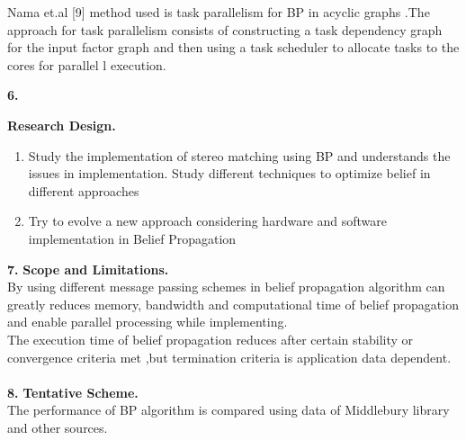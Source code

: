 {{{{{{{{{{{Nama et.al [9]  method used is task parallelism for BP in acyclic graphs .The approach for task parallelism consists of constructing a task dependency graph for the input factor graph and then using a task scheduler to allocate tasks to the cores for parallel l execution.\\
{\Large\textbf{6.} \vspace{0.5in} {\Large\textbf{Research Design.}\
\begin{enumerate}
\item Study the implementation of stereo matching using BP and understands the issues in implementation. Study different techniques to optimize belief in different approaches
\item  Try to evolve a new approach considering hardware and software implementation in Belief Propagation
\end{enumerate}
{\Large\textbf{7.} \vspace{0.5in} {\Large\textbf{Scope and Limitations.}\\
 By using different message passing schemes in belief propagation algorithm can greatly reduces memory, bandwidth and computational time of belief propagation and enable parallel processing while implementing.\\
The execution time of belief propagation reduces after certain stability or convergence criteria met ,but termination criteria is application data dependent.\\\\
{\Large\textbf{8.} \vspace{0.5in} {\Large\textbf{Tentative Scheme.}\\
The performance of BP algorithm is compared  using data of  Middlebury library and other sources.\\\\\\\\\\\\\\\
}}}}}}}}}}}}}}}}}
